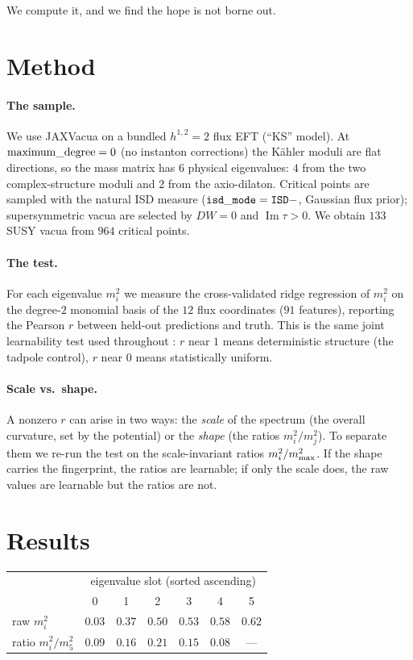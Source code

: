 \documentclass[11pt]{article}
\begin{document}
We compute it, and we find the hope is not borne out.

\section{Method}

\paragraph{The sample.} We use JAXVacua \cite{jaxvacua} on a bundled $h^{1,2}=2$
flux EFT (``KS'' model). At ${\rm maximum\_degree}=0$ (no instanton corrections)
the K\"ahler moduli are flat directions, so the mass matrix has $6$ physical
eigenvalues: $4$ from the two complex-structure moduli and $2$ from the
axio-dilaton. Critical points are sampled with the natural ISD measure
(${\tt isd\_mode}={\tt ISD-}$, Gaussian flux prior); supersymmetric vacua are
selected by $D W = 0$ and $\operatorname{Im}\tau > 0$. We obtain $133$ SUSY
vacua from $964$ critical points.

\paragraph{The test.} For each eigenvalue $m^2_i$ we measure the cross-validated
ridge regression of $m^2_i$ on the degree-$2$ monomial basis of the $12$ flux
coordinates ($91$ features), reporting the Pearson $r$ between held-out
predictions and truth. This is the same joint learnability test used throughout
\cite{pacland}: $r$ near $1$ means deterministic structure (the tadpole control),
$r$ near $0$ means statistically uniform.

\paragraph{Scale vs.\ shape.} A nonzero $r$ can arise in two ways: the
\emph{scale} of the spectrum (the overall curvature, set by the potential) or the
\emph{shape} (the ratios $m^2_i / m^2_j$). To separate them we re-run the test on
the scale-invariant ratios $m^2_i / m^2_{\rm max}$. If the shape carries the
fingerprint, the ratios are learnable; if only the scale does, the raw values are
learnable but the ratios are not.

\section{Results}

\begin{center}
\begin{tabular}{lcccccc}
\toprule
 & \multicolumn{6}{c}{eigenvalue slot (sorted ascending)} \\
 & 0 & 1 & 2 & 3 & 4 & 5 \\
\midrule
raw $m^2_i$ & $0.03$ & $0.37$ & $0.50$ & $0.53$ & $0.58$ & $\mathbf{0.62}$ \\
ratio $m^2_i / m^2_5$ & $0.09$ & $0.16$ & $0.21$ & $0.15$ & $0.08$ & --- \\
\bottomrule
\end{tabular}
\end{center}
\end{document}
